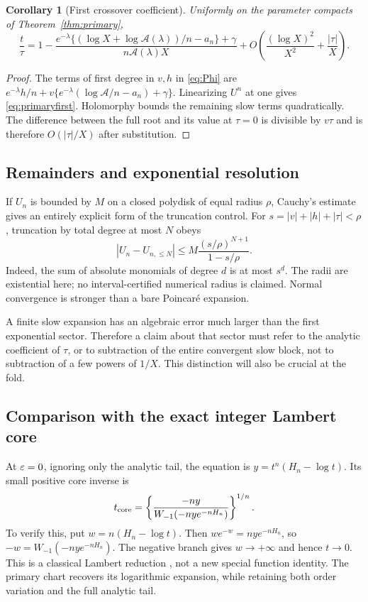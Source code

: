 \documentclass[11pt,a4paper]{article}
\numberwithin{equation}{section}
\newtheorem{corollary}[theorem]{Corollary}
\theoremstyle{definition}\newtheorem{definition}[theorem]{Definition}
\theoremstyle{remark}\newtheorem{remark}[theorem]{Remark}
\newcommand{\A}{\mathcal A}\newcommand{\E}{\mathcal E}
\begin{document}
\begin{corollary}[First crossover coefficient]\label{cor:primaryfirst}
Uniformly on the parameter compacts of Theorem~\ref{thm:primary},
\begin{equation}\label{eq:primaryfirst}
 \frac{t}{\tau}=1-
 \frac{e^{-\lambda}\{(\log X+\log\A(\lambda))/n-a_n\}+\gamma}
      {n\A(\lambda)X}
 +O\left(\frac{(\log X)^2}{X^2}+\frac{|\tau|}{X}\right).
\end{equation}
\end{corollary}
\begin{proof}
The terms of first degree in $v,h$ in \eqref{eq:Phi} are
$e^{-\lambda}h/n+
 v\{e^{-\lambda}(\log\A/n-a_n)+\gamma\}$.
Linearizing $U^n$ at one gives \eqref{eq:primaryfirst}. Holomorphy bounds
the remaining slow terms quadratically. The difference between the full
root and its value at $\tau=0$ is divisible by $v\tau$ and is therefore
$O(|\tau|/X)$ after substitution.
\end{proof}

\subsection{Remainders and exponential resolution}
If $U_n$ is bounded by $M$ on a closed polydisk of equal radius $\rho$,
Cauchy's estimate gives an entirely explicit form of the truncation control.
For $s=|v|+|h|+|\tau|<\rho$, truncation by total degree at most $N$ obeys
\begin{equation}\label{eq:cauchyrem}
 |U_n-U_{n,\le N}|\le M\frac{(s/\rho)^{N+1}}{1-s/\rho}.
\end{equation}
Indeed, the sum of absolute monomials of degree $d$ is at most $s^d$.
The radii are existential here; no interval-certified numerical radius is
claimed. Normal convergence is stronger than a bare Poincar\'e expansion.

A finite slow expansion has an algebraic error much larger than the first
exponential sector. Therefore a claim about that sector must refer to the
analytic coefficient of $\tau$, or to subtraction of the entire convergent
slow block, not to subtraction of a few powers of $1/X$. This distinction
will also be crucial at the fold.

\subsection{Comparison with the exact integer Lambert core}
At $\varepsilon=0$, ignoring only the analytic tail, the equation is
$y=t^n(H_n-\log t)$. Its small positive core inverse is
\begin{equation}\label{eq:Lambertcore}
 t_{\rm core}=\left\{
 \frac{-ny}{W_{-1}(-ny e^{-nH_n})}\right\}^{1/n}.
\end{equation}
To verify this, put $w=n(H_n-\log t)$. Then
$we^{-w}=ny e^{-nH_n}$, so $-w=W_{-1}(-ny e^{-nH_n})$.
The negative branch gives $w\to+\infty$ and hence $t\to0$.
This is a classical Lambert reduction \cite{dlmf-w}, not a new special
function identity. The primary chart recovers its logarithmic expansion,
while retaining both order variation and the full analytic tail.
\end{document}
